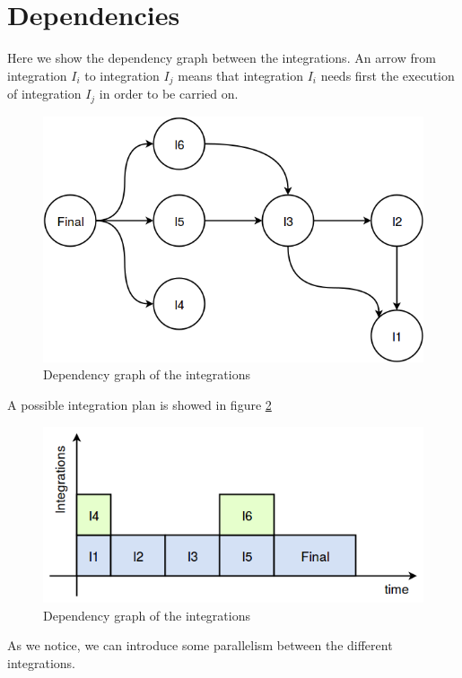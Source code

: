 \section{Dependencies}
Here we show the dependency graph between the integrations. An arrow from integration $I_i$ to integration $I_j$ means that integration $I_i$ needs first the execution of integration $I_j$ in order to be carried on.
\begin{figure}[H]
	\centering
	\includegraphics[scale = 0.5]{"../Analysis Documents/Dependencies"}
	\caption{Dependency graph of the integrations}
	\label{fig:dependency}
\end{figure}

A possible integration plan is showed in figure \ref{fig:schedule}
\begin{figure}[H]
	\centering
	\includegraphics[scale = 0.6]{"../Analysis Documents/schedule"}
	\caption{Dependency graph of the integrations}
	\label{fig:schedule}
\end{figure}
As we notice, we can introduce some parallelism between the different integrations.